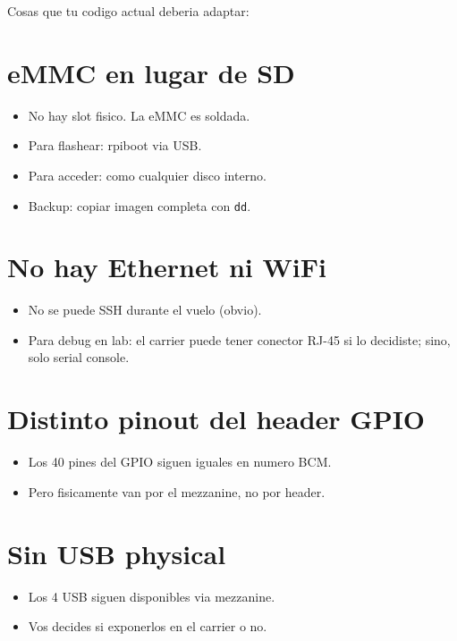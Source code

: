 \documentclass[11pt,a4paper,oneside,openright]{book}
\begin{document}
Cosas que tu codigo actual deberia adaptar:

\section{eMMC en lugar de SD}

\begin{itemize}[leftmargin=2em]
  \item No hay slot fisico. La eMMC es soldada.
  \item Para flashear: rpiboot via USB.
  \item Para acceder: como cualquier disco interno.
  \item Backup: copiar imagen completa con \texttt{dd}.
\end{itemize}

\section{No hay Ethernet ni WiFi}

\begin{itemize}[leftmargin=2em]
  \item No se puede SSH durante el vuelo (obvio).
  \item Para debug en lab: el carrier puede tener conector RJ-45 si lo
        decidiste; sino, solo serial console.
\end{itemize}

\section{Distinto pinout del header GPIO}

\begin{itemize}[leftmargin=2em]
  \item Los 40 pines del GPIO siguen iguales en numero BCM.
  \item Pero fisicamente van por el mezzanine, no por header.
\end{itemize}

\section{Sin USB physical}

\begin{itemize}[leftmargin=2em]
  \item Los 4 USB siguen disponibles via mezzanine.
  \item Vos decides si exponerlos en el carrier o no.
\end{itemize}
\end{document}
